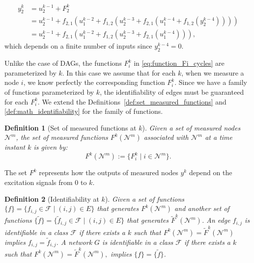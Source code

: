 \documentclass[letterpaper,10pt,journal]{IEEEtran}
\newcommand{\F}{\mathcal{F}}
\newtheorem{definition}{Definition}
\newcommand{\NN}{\mathcal{N}}
\begin{document}
\vspace{-3mm}

\small
\begin{align*}
        y_2^k&=u_2^{k-1}+F_2^k\\
        &=u_2^{k-1}+f_{2,1}(u_1^{k-2}+f_{1,2}(u_2^{k-3}+f_{2,1}(u_1^{k-4}+f_{1,2}(y_2^{k-4}))))\\
        &=u_2^{k-1}+f_{2,1}(u_1^{k-2}+f_{1,2}(u_2^{k-3}+f_{2,1}(u_1^{k-4}))),
    \end{align*}
\normalsize
which depends on a finite number of inputs since $y_2^{k-4}=0$. 

Unlike the case of DAGs, the functions $F_i^k$ in \eqref{eq:function_Fi_cycles} are parameterized by $k$. In this case we assume that for each $k$, when we measure a node $i$, we know perfectly the corresponding function $F_i^k$. Since we have a family of functions parameterized by $k$, the identifiability of edges must be guaranteed for each $F_i^k$. We extend the Definitions~\ref{def:set_measured_functions} and \ref{def:math_identifiability} for the family of functions.
\begin{definition}[Set of measured functions at $k$]\label{def:new_measured_nodes}
    Given a set of measured nodes  $\mathcal{N}^m$, the set of measured functions $F^k(\mathcal{N}^m)$ associated with $\mathcal{N}^m$  at a time instant $k$ is given by:
    $$
    F^k(\mathcal{N}^m):=\{F_i^k\;|\;i\in \mathcal{N}^m\}.
    $$
\end{definition}

The set $F^k$ represents how the outputs of measured nodes $y^k$ depend on the excitation signals from 0 to $k$.

\begin{definition}[Identifiability at $k$]\label{def:new_math_identifiability}
    Given a set of functions $\{ f \}=\{f_{i,j}\in \F\;|\;(i,j)\in E\}$ that generates $F^k(\NN^m)$ and another set of functions $\{ \tilde f \}=\{\tilde f_{i,j}\in\F\;|\;(i,j)\in E\}$ that generates $\tilde F^k(\NN^m)$. An edge $f_{i,j}$ is identifiable in a class $\F$ if there exists a $k$ such that $
    F^k(\NN^m)=\tilde F^k(\NN^m)
    $ implies $f_{i,j}=\tilde f_{i,j}$. A network $G$ is identifiable in a class $\F$ if there exists a $k$ such that 
    $
    F^k(\NN^m)=\tilde F^k(\NN^m),
    $
    implies
    $
    \{ f \}=\{ \tilde f \}
    $.
\end{definition}
\end{document}
